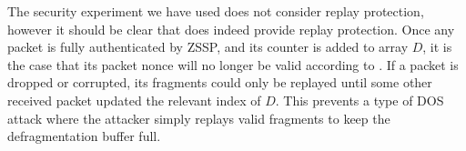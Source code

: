 \documentclass{article}
\begin{document}
The security experiment we have used does not consider replay protection, however it should be clear that  does indeed provide replay protection. Once any packet is fully authenticated by ZSSP, and its counter is added to array $D$, it is the case that its packet nonce will no longer be valid according to . If a packet is dropped or corrupted, its fragments could only be replayed until some other received packet updated the relevant index of $D$. This prevents a type of DOS attack where the attacker simply replays valid fragments to keep the defragmentation buffer full.

\medskip

\printbibliography
\end{document}

